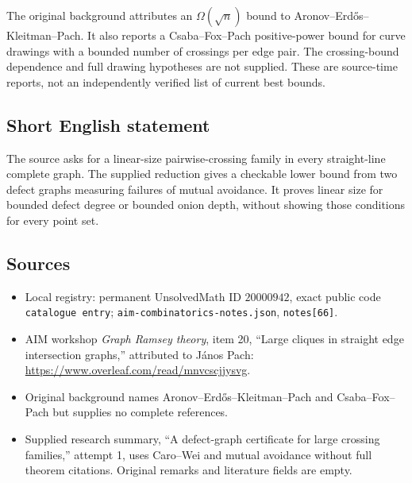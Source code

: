 \documentclass[11pt]{article}
\begin{document}
The original background attributes an \(\Omega(\sqrt n)\) bound to Aronov--Erd\H{o}s--Kleitman--Pach. It also reports a Csaba--Fox--Pach positive-power bound for curve drawings with a bounded number of crossings per edge pair. The crossing-bound dependence and full drawing hypotheses are not supplied. These are source-time reports, not an independently verified list of current best bounds.
\subsection{Short English statement}
The source asks for a linear-size pairwise-crossing family in every straight-line complete graph. The supplied reduction gives a checkable lower bound from two defect graphs measuring failures of mutual avoidance. It proves linear size for bounded defect degree or bounded onion depth, without showing those conditions for every point set.
\subsection{Sources}
\begin{itemize}
\item Local registry: permanent UnsolvedMath ID \(20000942\), exact public code \texttt{catalogue entry}; \texttt{aim-combinatorics-notes.json}, \texttt{notes[66]}.
\item AIM workshop \emph{Graph Ramsey theory}, item 20, ``Large cliques in straight edge intersection graphs,'' attributed to J\'anos Pach: \url{https://www.overleaf.com/read/mnvcscjjysvg}.
\item Original background names Aronov--Erd\H{o}s--Kleitman--Pach and Csaba--Fox--Pach but supplies no complete references.
\item Supplied research summary, ``A defect-graph certificate for large crossing families,'' attempt 1, uses Caro--Wei and mutual avoidance without full theorem citations. Original remarks and literature fields are empty.
\end{itemize}
\end{document}
